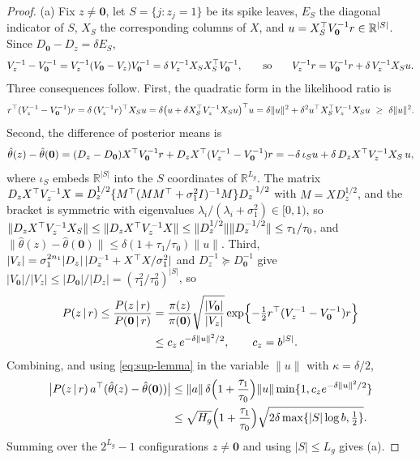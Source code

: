 \documentclass[11pt]{article}
\newcommand{\given}{\,\vert\,}
\theoremstyle{definition}
\theoremstyle{plain}
\begin{document}
{\begin{proof}
(a) Fix $z\ne\mathbf 0$, let $S=\{j:z_j=1\}$ be its spike leaves, $E_S$ the diagonal indicator of $S$, $X_S$ the corresponding columns of $X$, and $u=X_S^{\top} V_{\mathbf 0}^{-1}r\in\mathbb R^{|S|}$. Since $D_{\mathbf 0}-D_z=\delta E_S$,
\[
V_z^{-1}-V_{\mathbf 0}^{-1}=V_z^{-1}(V_{\mathbf 0}-V_z)V_{\mathbf 0}^{-1}=\delta\,V_z^{-1}X_SX_S^{\top} V_{\mathbf 0}^{-1},
\qquad\text{so}\qquad
V_z^{-1}r=V_{\mathbf 0}^{-1}r+\delta\,V_z^{-1}X_Su .
\]
Three consequences follow. First, the quadratic form in the likelihood ratio is
\[
r\tr(V_z^{-1}-V_{\mathbf 0}^{-1})r=\delta\,(V_z^{-1}r)\tr X_Su=\delta\bigl(u+\delta X_S\tr V_z^{-1}X_Su\bigr)\tr u=\delta\|u\|^2+\delta^2u\tr X_S\tr V_z^{-1}X_Su\ \ge\ \delta\|u\|^2 .
\]
Second, the difference of posterior means is
\[
\hat\theta(z)-\hat\theta(\mathbf 0)=(D_z-D_{\mathbf 0})X^{\top} V_{\mathbf 0}^{-1}r+D_zX^{\top}(V_z^{-1}-V_{\mathbf 0}^{-1})r=-\delta\,\iota_Su+\delta\,D_zX^{\top} V_z^{-1}X_S\,u ,
\]
where $\iota_S$ embeds $\mathbb R^{|S|}$ into the $S$ coordinates of $\mathbb R^{L_g}$. The matrix $D_zX^{\top} V_z^{-1}X=D_z^{1/2}\{M^{\top}(MM^{\top}+\sigma_1^2I)^{-1}M\}D_z^{-1/2}$ with $M=XD_z^{1/2}$, and the bracket is symmetric with eigenvalues $\lambda_i/(\lambda_i+\sigma_1^2)\in[0,1)$, so $\|D_zX^{\top} V_z^{-1}X_S\|\le\|D_zX^{\top} V_z^{-1}X\|\le\|D_z^{1/2}\|\|D_z^{-1/2}\|\le\tau_1/\tau_0$, and $\|\hat\theta(z)-\hat\theta(\mathbf 0)\|\le\delta(1+\tau_1/\tau_0)\|u\|$. Third, $|V_z|=\sigma_1^{2n_1}|D_z|\,|D_z^{-1}+X^{\top} X/\sigma_1^2|$ and $D_z^{-1}\succeq D_{\mathbf 0}^{-1}$ give $|V_{\mathbf 0}|/|V_z|\le|D_{\mathbf 0}|/|D_z|=(\tau_1^2/\tau_0^2)^{|S|}$, so
\begin{align*}
P(z\given r)\le\frac{P(z\given r)}{P(\mathbf 0\given r)}
&=\frac{\pi(z)}{\pi(\mathbf 0)}\sqrt{\frac{|V_{\mathbf 0}|}{|V_z|}}\exp\Bigl\{-\tfrac12r\tr(V_z^{-1}-V_{\mathbf 0}^{-1})r\Bigr\}\\
&\le c_z\,e^{-\delta\|u\|^2/2},\qquad c_z=b^{|S|}.
\end{align*}
Combining, and using \eqref{eq:sup-lemma} in the variable $\|u\|$ with $\kappa=\delta/2$,
\begin{align*}
\bigl|P(z\given r)\,a\tr(\hat\theta(z)-\hat\theta(\mathbf 0))\bigr|
&\le\|a\|\,\delta\Bigl(1+\frac{\tau_1}{\tau_0}\Bigr)\|u\|\min\{1,c_ze^{-\delta\|u\|^2/2}\}\\
&\le \sqrt{H_g}\Bigl(1+\frac{\tau_1}{\tau_0}\Bigr)\sqrt{2\delta\max\{|S|\log b,\tfrac12\}} .
\end{align*}
Summing over the $2^{L_g}-1$ configurations $z\ne\mathbf 0$ and using $|S|\le L_g$ gives (a).


\end{proof}}
\end{document}
